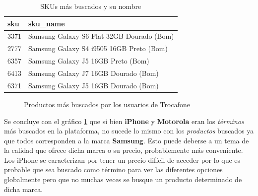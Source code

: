 \documentclass[a4paper]{article}
\begin{document}
\begin{table}[h!]
	\begin{center}
		\begin{tabular}{|l|l|}
			\hline
			sku & sku\_name \\
			\hline \hline
			3371 & Samsung Galaxy S6 Flat 32GB Dourado (Bom) \\ \hline			
			2777 & Samsung Galaxy S4 i9505 16GB Preto (Bom) \\ \hline
			6357 & Samsung Galaxy J5 16GB Preto (Bom) \\ \hline
			6413 & Samsung Galaxy J7 16GB Dourado (Bom) \\ \hline
			6371 & Samsung Galaxy J5 16GB Dourado (Bom) \\ \hline
		\end{tabular}
		\caption{SKUs más buscados y su nombre}
		\label{table:sencilla}
	\end{center}
\end{table}

\begin{figure}[h!]
	\caption{Productos más buscados por los usuarios de Trocafone}
	\label{fig:searchedproduct}
\end{figure}

Se concluye con el gráfico \ref{fig:searchedproduct} que si bien \textbf{iPhone} y \textbf{Motorola} eran los \textit{términos} más buscados en la plataforma, no sucede lo mismo con los \textit{productos} buscados ya que todos corresponden a la marca \textbf{Samsung}. Esto puede deberse a un tema de la calidad que ofrece dicha marca o su precio, probablemente más conveniente. Los iPhone se caracterizan por tener un precio difícil de acceder por lo que es probable que sea buscado como término para ver las diferentes opciones globalmente pero que no muchas veces se busque un producto determinado de dicha marca.
\end{document}
